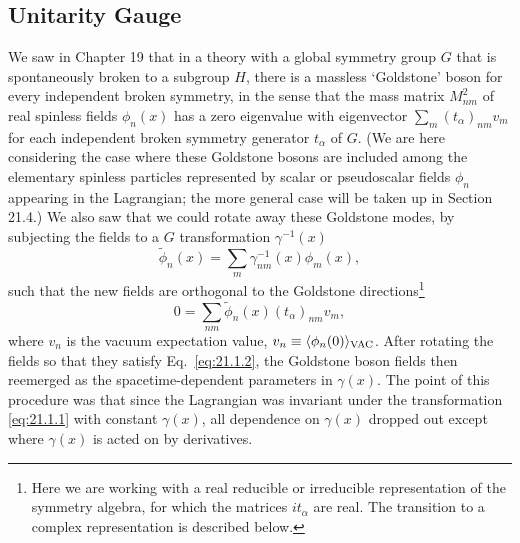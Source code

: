 \subsection{Unitarity Gauge}
\label{sec:21.1}

We saw in Chapter 19 that in a theory with a global symmetry group $G$ that
is spontaneously broken to a subgroup $H$, there is a massless `Goldstone'
boson for every independent broken symmetry, in the sense that the mass
matrix $M^2_{nm}$ of real spinless fields $\phi_n(x)$ has a zero eigenvalue
with eigenvector $\sum_m(t_\alpha)_{nm}v_m$ for each independent broken
symmetry generator $t_\alpha$ of $G$. (We are here considering the case
where these Goldstone bosons are included among the elementary spinless
particles represented by scalar or pseudoscalar fields $\phi_n$ appearing
in the Lagrangian; the more general case will be taken up in Section 21.4.)
We also saw that we could rotate away these Goldstone modes, by subjecting
the fields to a $G$ transformation $\gamma^{-1}(x)$
\begin{equation}
 \widetilde{\phi}_n(x)
 =\sum_m\gamma^{-1}_{nm}(x)\phi_m(x),
 \tag{21.1.1}\label{eq:21.1.1}
\end{equation}
such that the new fields are orthogonal to the Goldstone
directions\footnote{Here we are working with a real reducible or irreducible
representation of the symmetry algebra, for which the matrices $it_\alpha$
are real. The transition to a complex representation is described below.}
\begin{equation}
 0=\sum_{nm}\widetilde{\phi}_n(x)(t_\alpha)_{nm}v_m,
 \tag{21.1.2}\label{eq:21.1.2}
\end{equation}
where $v_n$ is the vacuum expectation value,
$v_n\equiv\langle\phi_n(0)\rangle_{\rm VAC}$. After rotating the fields so
that they satisfy Eq.~\eqref{eq:21.1.2}, the Goldstone boson fields then
reemerged as the spacetime-dependent parameters in $\gamma(x)$. The point
of this procedure was that since the Lagrangian was invariant under the
transformation \eqref{eq:21.1.1} with constant $\gamma(x)$, all dependence
on $\gamma(x)$ dropped out except where $\gamma(x)$ is acted on by
derivatives.

